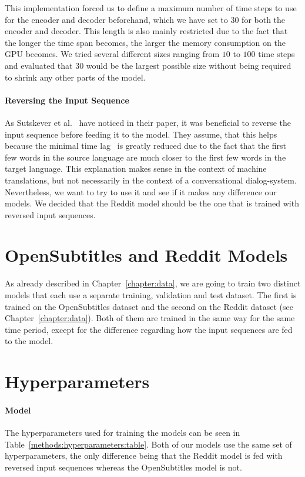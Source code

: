 This implementation forced us to define a maximum number of time steps to use for the encoder and decoder beforehand, which we have set to $30$ for both the encoder and decoder. This length is also mainly restricted due to the fact that the longer the time span becomes, the larger the memory consumption on the GPU becomes. We tried several different sizes ranging from $10$ to $100$ time steps and evaluated that $30$ would be the largest possible size without being required to shrink any other parts of the model.

\paragraph{Reversing the Input Sequence} As Sutskever et al.~\cite{Sutskever:2014} have noticed in their paper, it was beneficial to reverse the input sequence before feeding it to the model. They assume, that this helps because the minimal time lag~\cite{Hochreiter:1997} is greatly reduced due to the fact that the first few words in the source language are much closer to the first few words in the target language. This explanation makes sense in the context of machine translations, but not necessarily in the context of a conversational dialog-system. Nevertheless, we want to try to use it and see if it makes any difference our models. We decided that the Reddit model should be the one that is trained with reversed input sequences.

\section{OpenSubtitles and Reddit Models}
\label{methods:both_models}
As already described in Chapter~\ref{chapter:data}, we are going to train two distinct models that each use a separate training, validation and test dataset. The first is trained on the OpenSubtitles dataset and the second on the Reddit dataset (see Chapter~\ref{chapter:data}). Both of them are trained in the same way for the same time period, except for the difference regarding how the input sequences are fed to the model.

\section{Hyperparameters}
\label{methods:hyperparameters}

\paragraph{Model} The hyperparameters used for training the models can be seen in Table~\ref{methods:hyperparameters:table}. Both of our models use the same set of hyperparameters, the only difference being that the Reddit model is fed with reversed input sequences whereas the OpenSubtitles model is not.

